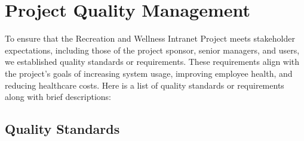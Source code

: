 \chapter{Project Quality Management}

To ensure that the Recreation and Wellness Intranet Project meets stakeholder expectations, including those of the project sponsor, senior managers, and users, we established quality standards or requirements. These requirements align with the project's goals of increasing system usage, improving employee health, and reducing healthcare costs. Here is a list of quality standards or requirements along with brief descriptions:

\section{Quality Standards}

